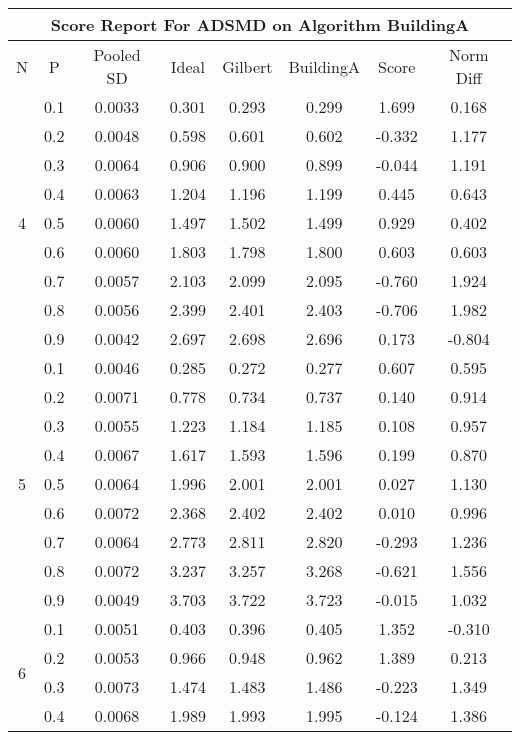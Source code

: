 \documentclass[11pt,a4paper]{report}
\begin{document}
\begin{longtable}{ | c | c || c | c | c | c | c | c | }
\hline
\multicolumn{8}{|c|}{ Score Report For ADSMD on Algorithm BuildingA} \\
\hline
N & P & Pooled SD &  Ideal &  Gilbert & BuildingA  & Score & Norm Diff \\
 \hline
 \hline
 \endhead
\multirow{9}{*}{4} & 0.1 & 0.0033 & 0.301 & 0.293 & 0.299 & 1.699 & 0.168 \\
 & 0.2 & 0.0048 & 0.598 & 0.601 & 0.602 & -0.332 & 1.177 \\
 & 0.3 & 0.0064 & 0.906 & 0.900 & 0.899 & -0.044 & 1.191 \\
 & 0.4 & 0.0063 & 1.204 & 1.196 & 1.199 & 0.445 & 0.643 \\
 & 0.5 & 0.0060 & 1.497 & 1.502 & 1.499 & 0.929 & 0.402 \\
 & 0.6 & 0.0060 & 1.803 & 1.798 & 1.800 & 0.603 & 0.603 \\
 & 0.7 & 0.0057 & 2.103 & 2.099 & 2.095 & -0.760 & 1.924 \\
 & 0.8 & 0.0056 & 2.399 & 2.401 & 2.403 & -0.706 & 1.982 \\
 & 0.9 & 0.0042 & 2.697 & 2.698 & 2.696 & 0.173 & -0.804 \\
 \hline
\multirow{9}{*}{5} & 0.1 & 0.0046 & 0.285 & 0.272 & 0.277 & 0.607 & 0.595 \\
 & 0.2 & 0.0071 & 0.778 & 0.734 & 0.737 & 0.140 & 0.914 \\
 & 0.3 & 0.0055 & 1.223 & 1.184 & 1.185 & 0.108 & 0.957 \\
 & 0.4 & 0.0067 & 1.617 & 1.593 & 1.596 & 0.199 & 0.870 \\
 & 0.5 & 0.0064 & 1.996 & 2.001 & 2.001 & 0.027 & 1.130 \\
 & 0.6 & 0.0072 & 2.368 & 2.402 & 2.402 & 0.010 & 0.996 \\
 & 0.7 & 0.0064 & 2.773 & 2.811 & 2.820 & -0.293 & 1.236 \\
 & 0.8 & 0.0072 & 3.237 & 3.257 & 3.268 & -0.621 & 1.556 \\
 & 0.9 & 0.0049 & 3.703 & 3.722 & 3.723 & -0.015 & 1.032 \\
 \hline
\multirow{9}{*}{6} & 0.1 & 0.0051 & 0.403 & 0.396 & 0.405 & 1.352 & -0.310 \\
 & 0.2 & 0.0053 & 0.966 & 0.948 & 0.962 & 1.389 & 0.213 \\
 & 0.3 & 0.0073 & 1.474 & 1.483 & 1.486 & -0.223 & 1.349 \\
 & 0.4 & 0.0068 & 1.989 & 1.993 & 1.995 & -0.124 & 1.386 \\

\end{longtable}
\end{document}
